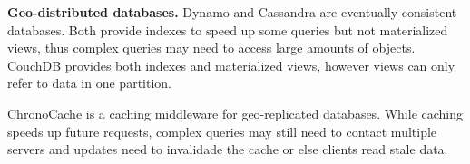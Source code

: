 \documentclass[sigplan,twocolumn,review,anonymous]{acmart}
\begin{document}
\noindent
\textbf{Geo-distributed databases.}
Dynamo \cite{dynamo} and Cassandra \cite{cassandra} are eventually consistent databases.
Both provide indexes to speed up some queries but not materialized views, thus complex queries may need to access large amounts of objects.
CouchDB \cite{couchDB} provides both indexes and materialized views, however views can only refer to data in one partition.

ChronoCache \cite{chronocache} is a caching middleware for geo-replicated databases. 
While caching speeds up future requests, complex queries may still need to contact multiple servers and 
updates need to invalidade the cache or else clients read stale data.





\end{document}
